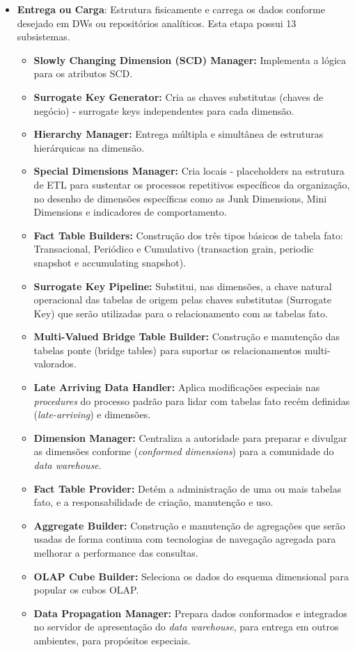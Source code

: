 \begin{itemize}
	\item \textbf{Entrega ou Carga}: Estrutura fisicamente e carrega os dados conforme desejado em DWs ou repositórios analíticos. Esta etapa possui 13 subsistemas.
		\begin{itemize}
			\item \textbf{Slowly Changing Dimension (SCD) Manager:} Implementa a lógica para os atributos SCD.
			\item \textbf{Surrogate Key Generator:} Cria as chaves substitutas (chaves de negócio) - surrogate keys independentes para cada dimensão.
			\item \textbf{Hierarchy Manager:} Entrega múltipla e simultânea de estruturas hierárquicas na dimensão.
			\item \textbf{Special Dimensions Manager:} Cria locais - placeholders na estrutura de ETL para sustentar os processos repetitivos específicos da organização, no desenho de dimensões específicas como as Junk Dimensions, Mini Dimensions e indicadores de comportamento.
			\item \textbf{Fact Table Builders:} Construção dos três tipos básicos de tabela fato: Transacional, Periódico e Cumulativo (transaction grain, periodic snapshot e accumulating snapshot).
			\item \textbf{Surrogate Key Pipeline:} Substitui, nas dimensões, a chave natural operacional das tabelas de origem pelas chaves substitutas (Surrogate Key) que serão utilizadas para o relacionamento com as tabelas fato.
			\item \textbf{Multi-Valued Bridge Table Builder:} Construção e manutenção das tabelas ponte (bridge tables) para suportar os relacionamentos multi-valorados.
			\item \textbf{Late Arriving Data Handler:} Aplica modificações especiais nas \textit{procedures} do processo padrão para lidar com tabelas fato recém definidas (\textit{late-arriving})  e dimensões.
			\item \textbf{Dimension Manager:} Centraliza a autoridade para preparar e divulgar as dimensões conforme (\textit{conformed dimensions}) para a comunidade do \textit{data warehouse}.
			\item \textbf{Fact Table Provider:} Detém a administração de uma ou mais tabelas fato, e a responsabilidade de criação, manutenção e uso.
			\item \textbf{Aggregate Builder:} Construção e manutenção de agregações que serão usadas de forma continua com tecnologias de navegação agregada para melhorar a  performance das consultas.
			\item \textbf{OLAP Cube Builder:} Seleciona os dados do esquema dimensional para popular os cubos OLAP. 
			\item \textbf{Data Propagation Manager:} Prepara dados conformados e integrados no servidor de apresentação do \textit{data warehouse}, para entrega em outros ambientes, para propósitos especiais.
		\end{itemize}
	

\end{itemize}

